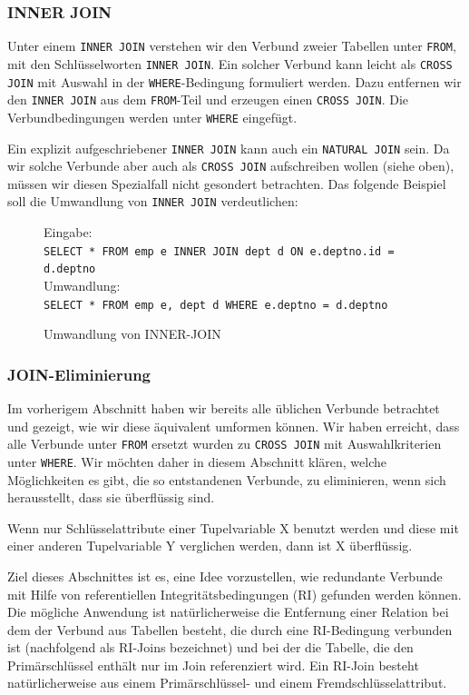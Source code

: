 \subsubsection*{INNER JOIN}

Unter einem \verb|INNER JOIN| verstehen wir den Verbund zweier Tabellen unter \verb|FROM|, mit den Schlüsselworten \verb|INNER JOIN|. Ein solcher Verbund kann leicht als \verb|CROSS JOIN| mit Auswahl in der \verb|WHERE|-Bedingung formuliert werden. Dazu entfernen wir den \verb|INNER JOIN| aus dem \verb|FROM|-Teil und erzeugen einen \verb|CROSS JOIN|. Die Verbundbedingungen werden unter \verb|WHERE| eingefügt.

Ein explizit aufgeschriebener \verb|INNER JOIN| kann auch ein \verb|NATURAL JOIN| sein. Da wir solche Verbunde aber auch als \verb|CROSS JOIN| aufschreiben wollen (siehe oben), müssen wir diesen Spezialfall nicht gesondert betrachten. Das folgende Beispiel soll die Umwandlung von \verb|INNER JOIN| verdeutlichen:

\begin{figure}[h]
Eingabe:\\
\verb|SELECT * FROM emp e INNER JOIN dept d ON e.deptno.id = d.deptno|\\

Umwandlung:\\
\verb|SELECT * FROM emp e, dept d WHERE e.deptno = d.deptno|\\
\caption{Umwandlung von INNER-JOIN}
\end{figure}


\subsubsection{JOIN-Eliminierung}

Im vorherigem Abschnitt haben wir bereits alle üblichen Verbunde betrachtet und gezeigt, wie wir diese äquivalent umformen können. Wir haben erreicht, dass alle Verbunde unter \verb|FROM| ersetzt wurden zu \verb|CROSS JOIN| mit Auswahlkriterien unter \verb|WHERE|. Wir möchten daher in diesem Abschnitt klären, welche Möglichkeiten es gibt, die so entstandenen Verbunde, zu eliminieren, wenn sich herausstellt, dass sie überflüssig sind.

Wenn nur Schlüsselattribute einer Tupelvariable X benutzt werden und diese mit  einer anderen Tupelvariable Y verglichen werden, dann ist X überflüssig.

Ziel dieses Abschnittes ist es, eine Idee vorzustellen, wie redundante Verbunde mit Hilfe von referentiellen Integritätsbedingungen (RI) gefunden werden können. 
Die mögliche Anwendung ist natürlicherweise die Entfernung einer Relation bei dem der Verbund aus Tabellen besteht, die durch eine RI-Bedingung verbunden ist (nachfolgend als RI-Joins bezeichnet) und bei der die Tabelle, die den Primärschlüssel enthält nur im Join referenziert wird. Ein RI-Join besteht natürlicherweise aus einem Primärschlüssel- und einem Fremdschlüsselattribut.

